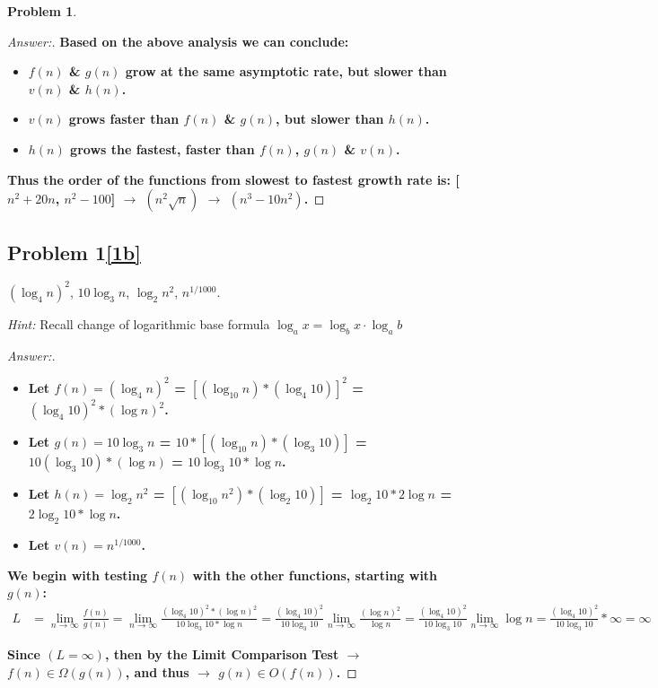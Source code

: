 \documentclass[11pt]{article}
\theoremstyle{definition}
\theoremstyle{definition}
\newtheorem{required}{Problem}
\theoremstyle{definition}
\begin{document}
\begin{required}
\begin{enumerate} [label=(\alph*)]
\begin{proof}[Answer:]
\item \textbf{Based on the above analysis we can conclude:}
\begin{itemize}
\item \textbf{$f(n)$ \& $g(n)$ grow at the same asymptotic rate, but slower than $v(n)$ \& $h(n)$.}
\item \textbf{$v(n)$ grows faster than $f(n)$ \& $g(n)$, but slower than $h(n)$.}
\item \textbf{$h(n)$ grows the fastest, faster than $f(n)$, $g(n)$ \& $v(n)$.}
\end{itemize}
\item \textbf{Thus the order of the functions from slowest to fastest growth rate is: [$n^2+20n$, $n^2-100$] $\to$ $(n^2\sqrt{n})$ $\to$ $(n^3-10n^2)$.}
    \end{proof}
        
    \newpage
\subsection{Problem 1\ref{1b}}
    \item \label{1b} $ (\log_4 n)^2 $, \qquad $10 \log_3 n$, \qquad $\log_2 n^2$, \qquad $n^{1/1000}$.
    
    \emph{Hint:} Recall change of logarithmic base formula $\log_a x = \log_b x\cdot\log_a b$
    \begin{proof}[Answer:] \

\begin{itemize}
\item \textbf{Let $f(n) = (\log_4 n)^2$ = $[(\log_{10} n) * (\log_4 10)]^2$ = $(\log_4 10)^2 * (\log n)^2$.}
\item \textbf{Let $g(n) = 10 \log_3 n$ = $10 * [(\log_{10} n) * (\log_3 10)]$ = $10 (\log_3 10) * (\log n)$ = $10\log_3 10 * \log n$.}
\item \textbf{Let $h(n) = \log_2 n^2$ = $[(\log_{10} n^2) * (\log_2 10)]$ = $\log_2 10 * 2\log n$ = $2\log_2 10 * \log n$.}
\item \textbf{Let $v(n) = n^{1/1000}$.}
\end{itemize}

\item \textbf{We begin with testing $f(n)$ with the other functions, starting with $g(n)$:}
\begin{align*}
L &= \lim_{n \to \infty} \frac{f(n)}{g(n)} = \lim_{n \to \infty} \frac{(\log_4 10)^2 * (\log n)^2}{10\log_3 10 * \log n} = \frac{(\log_4 10)^2}{10\log_3 10}  \lim_{n \to \infty} \frac{(\log n)^2}{\log n} = \frac{(\log_4 10)^2}{10\log_3 10} \lim_{n \to \infty} \log n = \frac{(\log_4 10)^2}{10\log_3 10} * \infty = \infty
\end{align*}
\item \textbf{Since $(L = \infty)$, then by the Limit Comparison Test $\to$ $f(n) \in \Omega(g(n))$, and thus $\to$ $g(n) \in O(f(n))$.}


\end{proof}
\end{enumerate}
\end{required}
\end{document}

